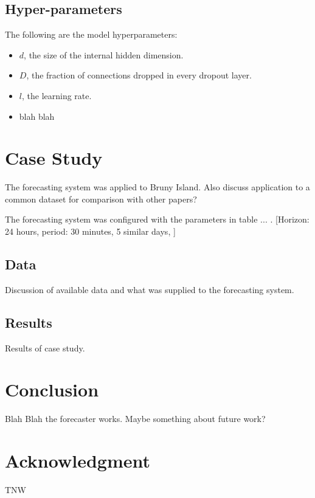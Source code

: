 \documentclass[conference]{IEEEtran}
\begin{document}
\subsection{Hyper-parameters}
The following are the model hyperparameters:
\begin{itemize}
	\item $d$, the size of the internal hidden dimension.
	\item $D$, the fraction of connections dropped in every dropout layer.
	\item $l$, the learning rate.
	\item blah blah 
\end{itemize}


\section{Case Study}
The forecasting system was applied to Bruny Island.
Also discuss application to a common dataset for comparison with other papers?

The forecasting system was configured with the parameters in table ... .
[Horizon: 24 hours, period: 30 minutes, 5 similar days, ]

\subsection{Data}
Discussion of available data and what was supplied to the forecasting system.

\subsection{Results}
Results of case study.

\section{Conclusion}
Blah Blah the forecaster works.
Maybe something about future work?


\section*{Acknowledgment}
TNW




\end{document}
